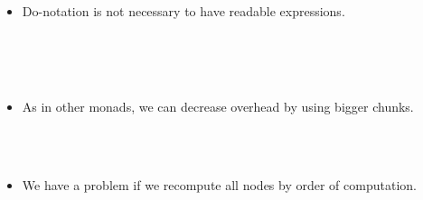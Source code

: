 \documentclass{beamer}
\begin{document}
\begin{itemize}
  \item Do-notation is not necessary to have readable expressions.
  
  {}{\hlopt{(/) = }}{}{\hlopt{(/) }}{\hlendline{}}\\
  {}{\hlopt{( * ) = }}{}{\hlopt{( * )
  }}{\hlendline{}}\\
  {}{\hlopt{(+) = }}{}{\hlopt{(+) }}{\hlendline{}}\\
  {}{}{\hlopt{= }}{}{\hlopt{/ }}{}{\hlopt{+ }}{}{\hlopt{* }}{}{\hlopt{+
  }}{}{\hlendline{}}
  
  \item As in other monads, we can decrease overhead by using bigger chunks.
  
  {}{}{\hlopt{= }}{}{\hlopt{(}}{}{}{\hlopt{-> }}{}{\hlopt{/
  }}{}{\hlopt{) }}{\hlendline{}}\\
  {}{}{\hlopt{= }}{}{\hlopt{(}}{}{}{\hlopt{-> }}{}{\hlopt{+ }}{}{\hlopt{* }}{}{\hlopt{)
  }}{\hlendline{}}\\
  {}{}{\hlopt{= }}{}{\hlopt{(}}{}{}{\hlopt{-> }}{}{\hlopt{+ }}{}{\hlopt{)}}{\hlendline{}}
  
  \item We have a problem if we recompute all nodes by order of computation.
  
  {}{}{\hlopt{= }}{}{\hlopt{>>= }}{}{}{\hlopt{-> }}{}{\hlopt{(}}{}{\hlopt{=
  }}{}{\hlopt{) }}{\hlendline{}}\\
  {}{}{\hlopt{= }}{}{\hlopt{>>= }}{}{}{\hlopt{-> }}{}{\hlopt{(}}{}{\hlopt{/ }}{}{\hlopt{) }}{\hlendline{}}\\
  {}{}{\hlopt{= }}{}{\hlopt{(}}{}{}{\hlopt{->}}{}{}{}{}{}{}{}{\hlopt{)}}
  
  

\end{itemize}
\end{document}
